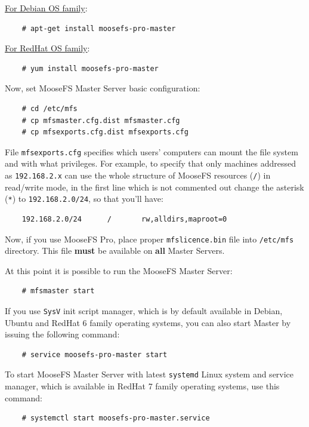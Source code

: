 \documentclass[a4paper,11pt,english]{report}
\def\code#1{\texttt{#1}}
\begin{document}
		\underline{For Debian OS family}:
		\begin{lstlisting}
	# apt-get install moosefs-pro-master
		\end{lstlisting}
		
		
		\underline{For RedHat OS family}:
		\begin{lstlisting}
	# yum install moosefs-pro-master
		\end{lstlisting}
		
		Now, set MooseFS Master Server basic configuration:
		\begin{lstlisting}
	# cd /etc/mfs
	# cp mfsmaster.cfg.dist mfsmaster.cfg
	# cp mfsexports.cfg.dist mfsexports.cfg
		\end{lstlisting}

		File \code{mfsexports.cfg} specifies which users' computers can mount the file system and with what privileges. For example, to specify that only machines addressed as \code{192.168.2.x} can use the whole structure of MooseFS resources (\code{/}) in read/write mode, in the first line which is not commented out change the asterisk (\code{*}) to \code{192.168.2.0/24}, so that you'll have:

		\begin{lstlisting}
	192.168.2.0/24		/		rw,alldirs,maproot=0
		\end{lstlisting}
		
		Now, if you use MooseFS Pro, place proper \code{mfslicence.bin} file into \code{/etc/mfs} directory. This file \textbf{must} be available on \textbf{all} Master Servers.
		
		At this point it is possible to run the MooseFS Master Server:
		\begin{lstlisting}
	# mfsmaster start
		\end{lstlisting}
		
		If you use \code{SysV} init script manager, which is by default available in Debian, Ubuntu and RedHat 6 family operating systems, you can also start Master by issuing the following command:

		\begin{lstlisting}
	# service moosefs-pro-master start
		\end{lstlisting}
		
		To start MooseFS Master Server with latest \code{systemd} Linux system and service manager, which is available in RedHat 7 family operating systems, use this command:

		\begin{lstlisting}
	# systemctl start moosefs-pro-master.service
		\end{lstlisting}
\end{document}

